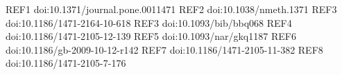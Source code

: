 REF1 doi:10.1371/journal.pone.0011471
REF2 doi:10.1038/nmeth.1371
REF3 doi:10.1186/1471-2164-10-618
REF3 doi:10.1093/bib/bbq068
REF4 doi:10.1186/1471-2105-12-139
REF5 doi:10.1093/nar/gkq1187
REF6 doi:10.1186/gb-2009-10-12-r142
REF7 doi:10.1186/1471-2105-11-382
REF8 doi:10.1186/1471-2105-7-176